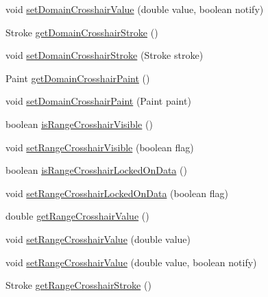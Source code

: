 \begin{DoxyCompactItemize}
\item 
void \mbox{\hyperlink{classorg_1_1jfree_1_1chart_1_1plot_1_1_contour_plot_ae52230aa19df4d6013a7bd0323eec5cc}{set\+Domain\+Crosshair\+Value}} (double value, boolean notify)
\item 
Stroke \mbox{\hyperlink{classorg_1_1jfree_1_1chart_1_1plot_1_1_contour_plot_a3b95ef347e5d4ebd3b3d51963ffd34a8}{get\+Domain\+Crosshair\+Stroke}} ()
\item 
void \mbox{\hyperlink{classorg_1_1jfree_1_1chart_1_1plot_1_1_contour_plot_ac96b87c25318fab5114d7248cc055a0a}{set\+Domain\+Crosshair\+Stroke}} (Stroke stroke)
\item 
Paint \mbox{\hyperlink{classorg_1_1jfree_1_1chart_1_1plot_1_1_contour_plot_af422823cc88cf7500854275f0da92cdf}{get\+Domain\+Crosshair\+Paint}} ()
\item 
void \mbox{\hyperlink{classorg_1_1jfree_1_1chart_1_1plot_1_1_contour_plot_a383b46fd37a691fb0b5ff7e961fbf0d4}{set\+Domain\+Crosshair\+Paint}} (Paint paint)
\item 
boolean \mbox{\hyperlink{classorg_1_1jfree_1_1chart_1_1plot_1_1_contour_plot_ad77f54677564a3949d2e7097b1cce708}{is\+Range\+Crosshair\+Visible}} ()
\item 
void \mbox{\hyperlink{classorg_1_1jfree_1_1chart_1_1plot_1_1_contour_plot_a50a42c7831f868fb2cc9ec0f9059d245}{set\+Range\+Crosshair\+Visible}} (boolean flag)
\item 
boolean \mbox{\hyperlink{classorg_1_1jfree_1_1chart_1_1plot_1_1_contour_plot_aba4bfd370dea479f2b9077b43435b2bf}{is\+Range\+Crosshair\+Locked\+On\+Data}} ()
\item 
void \mbox{\hyperlink{classorg_1_1jfree_1_1chart_1_1plot_1_1_contour_plot_a8da95d1e0ad83c2a6b739a65f194f3a5}{set\+Range\+Crosshair\+Locked\+On\+Data}} (boolean flag)
\item 
double \mbox{\hyperlink{classorg_1_1jfree_1_1chart_1_1plot_1_1_contour_plot_a2b31be05ae6cb78c7d26ffc4334047eb}{get\+Range\+Crosshair\+Value}} ()
\item 
void \mbox{\hyperlink{classorg_1_1jfree_1_1chart_1_1plot_1_1_contour_plot_ac68a5bcb1f32b573b0edc4fc2f8ea59b}{set\+Range\+Crosshair\+Value}} (double value)
\item 
void \mbox{\hyperlink{classorg_1_1jfree_1_1chart_1_1plot_1_1_contour_plot_ab8d5bed363c87aec830fdaf842c1b8ab}{set\+Range\+Crosshair\+Value}} (double value, boolean notify)
\item 
Stroke \mbox{\hyperlink{classorg_1_1jfree_1_1chart_1_1plot_1_1_contour_plot_ab9970ba4aad38b9d3abc80625ae41395}{get\+Range\+Crosshair\+Stroke}} ()

\end{DoxyCompactItemize}
